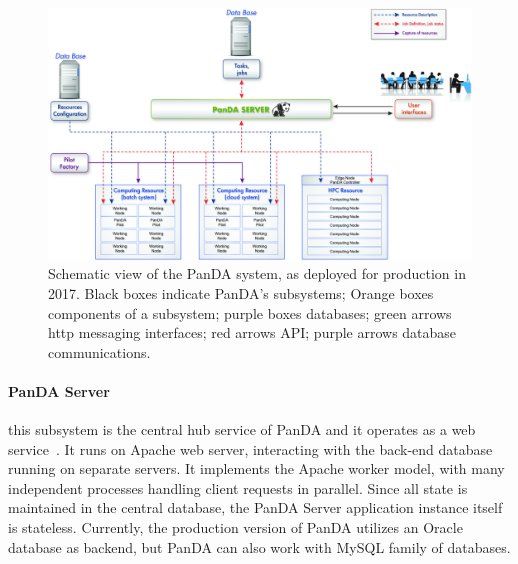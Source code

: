 \begin{figure}
  \begin{center}
    \includegraphics[width=\columnwidth]{figures/PandaArch.jpg}
  \end{center}
\caption{Schematic view of
the PanDA system, as deployed for production in 2017. Black boxes indicate
PanDA's subsystems; Orange boxes components of a subsystem; purple boxes
databases; green arrows http messaging interfaces; red arrows API; purple arrows
database communications.}
\label{fig:architecture}
\end{figure}

\paragraph{\textbf{PanDA Server}} this subsystem is the central hub service of
PanDA and it operates as a web service~\cite{maeno2011overview}. It runs on
Apache web server, interacting with the back-end database running on separate
servers. It implements the Apache worker model, with many independent processes
handling client requests in parallel. Since all state is maintained in the
central database, the PanDA Server application instance itself is stateless.
Currently, the production version of PanDA utilizes an Oracle database as
backend, but PanDA can also work with MySQL family of databases.

